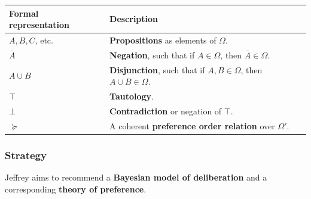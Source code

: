 \documentclass[11pt]{article}
\begin{document}
\begin{center}
\begin{tabular}{l|l}
Formal representation & Description\\
\hline
\(A, B, C\), etc. & \textbf{Propositions} as elements of \(\Omega\).\\
\(\bar{A}\) & \textbf{Negation}, such that if \(A \in \Omega\), then \(\bar{A} \in \Omega\).\\
\(A \cup B\) & \textbf{Disjunction}, such that if \(A, B \in \Omega\), then \(A \cup B \in \Omega\).\\
\(\top\) & \textbf{Tautology}.\\
\(\bot\) & \textbf{Contradiction} or negation of \(\top\).\\
\(\succeq\) & A coherent \textbf{preference order relation} over \(\Omega'\).\\
\end{tabular}
\end{center}
\subsubsection{Strategy}
\label{sec:org184f44c}
Jeffrey aims to recommend a \textbf{Bayesian model of deliberation} and a corresponding \textbf{theory of preference}.
\end{document}
